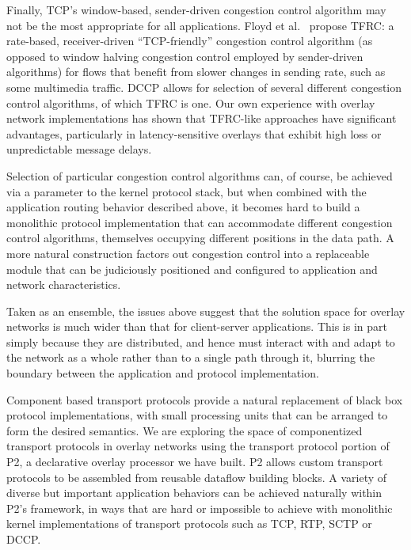 \documentclass{sig-alt-full}
\renewcommand{\subsection}[1]{\vspace{12pt}\noindent{\bf #1:}}
\begin{document}
\subsection{Alternative congestion control algorithms}
Finally, TCP's window-based, sender-driven congestion control
algorithm may not be the most appropriate for all applications.  Floyd
et al.~\cite{floyd00equationbased} propose TFRC: a rate-based,
receiver-driven ``TCP-friendly'' congestion control algorithm (as opposed
to window halving congestion control employed by sender-driven algorithms) for
flows that benefit from slower changes in sending rate, such as some
multimedia traffic.  DCCP allows for selection of several different
congestion control algorithms, of which TFRC is one. 
Our own experience with overlay network implementations has shown that 
TFRC-like approaches have significant advantages, particularly in
latency-sensitive overlays that exhibit high loss or unpredictable
message delays. 

Selection of particular congestion control algorithms can, of course, be achieved 
via a parameter to the
kernel protocol stack, but when combined with the application
routing behavior described above, it becomes hard to build a
monolithic protocol implementation that can accommodate different
congestion control algorithms, themselves occupying different
positions in the data path.   A more natural construction factors out
congestion control into a replaceable module that can be judiciously 
positioned and configured to application and network characteristics. 

\subsection{Discussion}
Taken as an ensemble, the issues above suggest that the solution space
for overlay networks is much wider than that for client-server
applications.  This is in part simply because they are distributed,
and hence must interact with and adapt to the network as a whole
rather than to a single path through it,  blurring the boundary
between the application and protocol implementation.  

Component based transport protocols provide a natural replacement of black 
box protocol implementations, with small processing units that can be arranged 
to form the desired semantics. We are exploring the space of componentized 
transport protocols in overlay networks using the transport protocol portion of P2, 
a declarative overlay processor we have built. P2 allows custom transport protocols 
to be assembled from reusable dataflow building blocks. A variety of diverse but
important application behaviors can be achieved naturally within P2's framework, 
in ways that are hard or impossible to achieve with monolithic kernel implementations 
of transport protocols such as TCP, RTP, SCTP or DCCP. 


\end{document}
